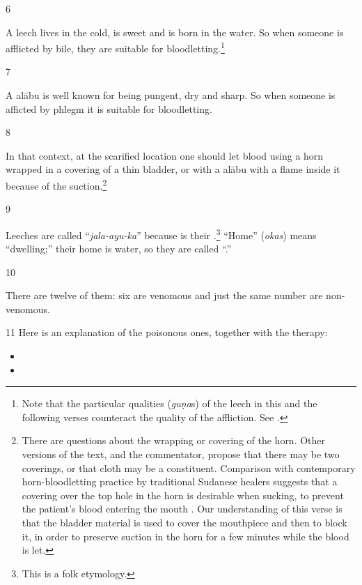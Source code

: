 \begin{translation}
\item[6]

A leech lives in the cold, is sweet and is born in the water. So when
someone is afflicted by bile, they are suitable for
bloodletting.\footnote{Note that the particular qualities (\emph{guṇa}s) of
    the leech in this and the following verses counteract the quality of the
    affliction.  See \cite[113, table 1]{broo-2018}.}

\item[7]

A \gls{alābu} is well known for being pungent, dry and sharp.  So
when someone is afficted by phlegm it is suitable for bloodletting.

\item[8]

In that context, at the scarified location one should let blood using a horn
wrapped in a covering of a thin bladder, or with a \gls{alābu} with a flame
inside it because of the suction.\footnote{There are questions about the
    wrapping or covering of the horn.  Other versions of the text, and the
    commentator, propose that there may be two coverings, or that cloth may be a
    constituent. Comparison with contemporary horn-bloodletting practice by
    traditional Sudanese healers suggests that a covering over the top hole in
    the horn is desirable when sucking, to prevent the patient's blood entering
    the mouth \citep{pbs-2020}.  Our understanding of this verse is that the
    bladder material is used to cover the mouthpiece and then to block it, in
    order to preserve suction in the horn for a few minutes while the blood is
    let. }

\item[9]

Leeches are called “\emph{jala-ayu-ka}” because  is their
.\footnote{This is a folk etymology.} “Home” (\emph{okas})
    means “{dwelling};” their home is water, so they are called
    “.”

\item[10]

There are twelve of them: six are venomous and just the same number are 
non-venomous. 

\item[11]
Here is an explanation of the poisonous ones, together with the therapy:
\begin{itemize}
    \item {}
    \item {}
    

\end{itemize}
\end{translation}
